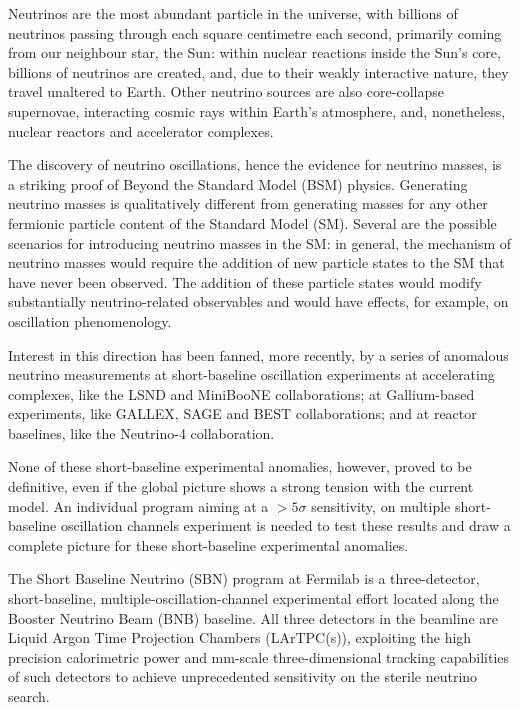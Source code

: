 

Neutrinos are the most abundant particle in the universe, with billions of neutrinos passing through each square centimetre each second, primarily coming from our neighbour star, the Sun: within nuclear reactions inside the Sun's core, billions of neutrinos are created, and, due to their weakly interactive nature, they travel unaltered to Earth. Other neutrino sources are also core-collapse supernovae, interacting cosmic rays within Earth's atmosphere, and, nonetheless, nuclear reactors and accelerator complexes. 

The discovery of neutrino oscillations, hence the evidence for neutrino masses, is a striking proof of Beyond the Standard Model (BSM) physics. 
Generating neutrino masses is qualitatively different from generating masses for any other fermionic particle content of the Standard Model (SM).  
Several are the possible scenarios for introducing neutrino masses in the SM: in general, the mechanism of neutrino masses would require the addition of new particle states to the SM that have never been observed. The addition of these particle states would modify substantially neutrino-related observables and would have effects, for example, on oscillation phenomenology. 

Interest in this direction has been fanned, more recently, by a series of anomalous neutrino measurements at short-baseline oscillation experiments at accelerating complexes, like the LSND and MiniBooNE collaborations; at Gallium-based experiments, like GALLEX, SAGE and BEST collaborations; and at reactor baselines, like the Neutrino-4 collaboration.

None of these short-baseline experimental anomalies, however, proved to be definitive, even if the global picture shows a strong tension with the current model. An individual program aiming at a $>5\sigma$ sensitivity, on multiple short-baseline oscillation channels experiment is needed to test these results and draw a complete picture for these short-baseline experimental anomalies. 

The Short Baseline Neutrino (SBN) program at Fermilab is a three-detector, short-baseline, multiple-oscillation-channel experimental effort located along the Booster Neutrino Beam (BNB) baseline. All three detectors in the beamline are Liquid Argon Time Projection Chambers (LArTPC(s)), exploiting the high precision calorimetric power and mm-scale three-dimensional tracking capabilities of such detectors to achieve unprecedented sensitivity on the sterile neutrino search. 

